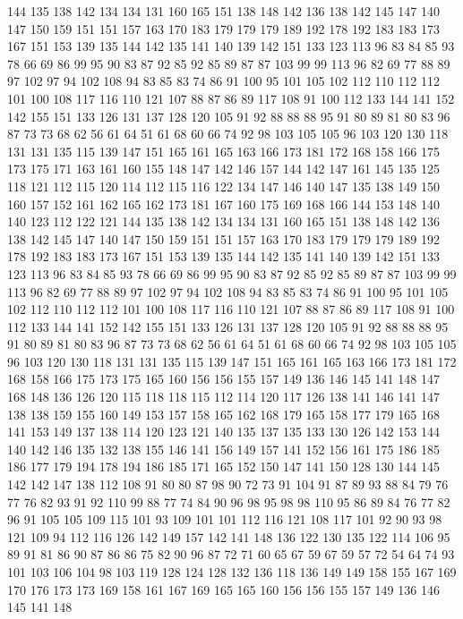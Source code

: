 144 135 138 142 134 134 131 160 165 151 138 148 142 136 138 142 145 147 140 147
150 159 151 151 157 163 170 183 179 179 179 189 192 178 192 183 183 173 167 151
153 139 135 144 142 135 141 140 139 142 151 133 123 113 96 83 84 85 93 78
66 69 86 99 95 90 83 87 92 85 92 85 89 87 87 103 99 99 113 96
82 69 77 88 89 97 102 97 94 102 108 94 83 85 83 74 86 91 100 95
101 105 102 112 110 112 112 101 100 108 117 116 110 121 107 88 87 86 89 117
108 91 100 112 133 144 141 152 142 155 151 133 126 131 137 128 120 105 91 92
88 88 88 95 91 80 89 81 80 83 96 87 73 73 68 62 56 61 64 51
61 68 60 66 74 92 98 103 105 105 96 103 120 130 118 131 131 135 115 139
147 151 165 161 165 163 166 173 181 172 168 158 166 175 173 175 171 163 161 160
155 148 147 142 146 157 144 142 147 161 145 135 125 118 121 112 115 120 114 112
115 116 122 134 147 146 140 147 135 138 149 150 160 157 152 161 162 165 162 173
181 167 160 175 169 168 166 144 153 148 140 140 123 112 122 121 144 135 138 142
134 134 131 160 165 151 138 148 142 136 138 142 145 147 140 147 150 159 151 151
157 163 170 183 179 179 179 189 192 178 192 183 183 173 167 151 153 139 135 144
142 135 141 140 139 142 151 133 123 113 96 83 84 85 93 78 66 69 86 99
95 90 83 87 92 85 92 85 89 87 87 103 99 99 113 96 82 69 77 88
89 97 102 97 94 102 108 94 83 85 83 74 86 91 100 95 101 105 102 112
110 112 112 101 100 108 117 116 110 121 107 88 87 86 89 117 108 91 100 112
133 144 141 152 142 155 151 133 126 131 137 128 120 105 91 92 88 88 88 95
91 80 89 81 80 83 96 87 73 73 68 62 56 61 64 51 61 68 60 66
74 92 98 103 105 105 96 103 120 130 118 131 131 135 115 139 147 151 165 161
165 163 166 173 181 172 168 158 166 175 173 175 165 160 156 156 155 157 149 136
146 145 141 148 147 168 148 136 126 120 115 118 118 115 112 114 120 117 126 138
141 146 141 147 138 138 159 155 160 149 153 157 158 165 162 168 179 165 158 177
179 165 168 141 153 149 137 138 114 120 123 121 140 135 137 135 133 130 126 142
153 144 140 142 146 135 132 138 155 146 141 156 149 157 141 152 156 161 175 186
185 186 177 179 194 178 194 186 185 171 165 152 150 147 141 150 128 130 144 145
142 142 147 138 112 108 91 80 80 87 98 90 72 73 91 104 91 87 89 93
88 84 79 76 77 76 82 93 91 92 110 99 88 77 74 84 90 96 98 95
98 98 110 95 86 89 84 76 77 82 96 91 105 105 109 115 101 93 109 101
101 112 116 121 108 117 101 92 90 93 98 121 109 94 112 116 126 142 149 157
142 141 148 136 122 130 135 122 114 106 95 89 91 81 86 90 87 86 86 75
82 90 96 87 72 71 60 65 67 59 67 59 57 72 54 64 74 93 101 103
106 104 98 103 119 128 124 128 132 136 118 136 149 149 158 155 167 169 170 176
173 173 169 158 161 167 169 165 165 160 156 156 155 157 149 136 146 145 141 148
